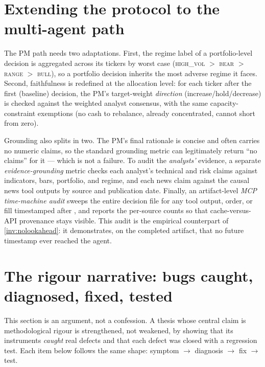 \section{Extending the protocol to the multi-agent path}
\label{sec:pmeval}

The PM path needs two adaptations. First, the regime label of a portfolio-level decision is
aggregated across its tickers by worst case (\textsc{high\_vol} $>$ \textsc{bear} $>$
\textsc{range} $>$ \textsc{bull}), so a portfolio decision inherits the most adverse regime
it faces. Second, faithfulness is redefined at the allocation level: for each
ticker after the first (baseline) decision, the PM's target-weight \emph{direction}
(increase/hold/decrease) is checked against the weighted analyst consensus, with the same
capacity-constraint exemptions (no cash to rebalance, already concentrated, cannot short from
zero).

Grounding also splits in two. The PM's final rationale is concise and often carries no
numeric claims, so the standard grounding metric can legitimately return ``no claims'' for
it --- which is not a failure. To audit the \emph{analysts'} evidence, a separate
\emph{evidence-grounding} metric checks each analyst's technical and risk claims against
indicators, bars, portfolio, and regime, and each news claim against the causal news tool
outputs by source and publication date. Finally, an artifact-level \emph{MCP time-machine
audit} sweeps the entire decision file for any tool output, order, or fill timestamped after
\tnow, and reports the per-source counts so that cache-versus-API provenance stays visible.
This audit is the empirical counterpart of \cref{inv:nolookahead}: it demonstrates, on the
completed artifact, that no future timestamp ever reached the agent.

\section{The rigour narrative: bugs caught, diagnosed, fixed, tested}
\label{sec:rigour}

This section is an argument, not a confession. A thesis whose central claim is methodological
rigour is strengthened, not weakened, by showing that its instruments \emph{caught} real
defects and that each defect was closed with a regression test. Each item below follows the
same shape: symptom $\rightarrow$ diagnosis $\rightarrow$ fix $\rightarrow$ test.

